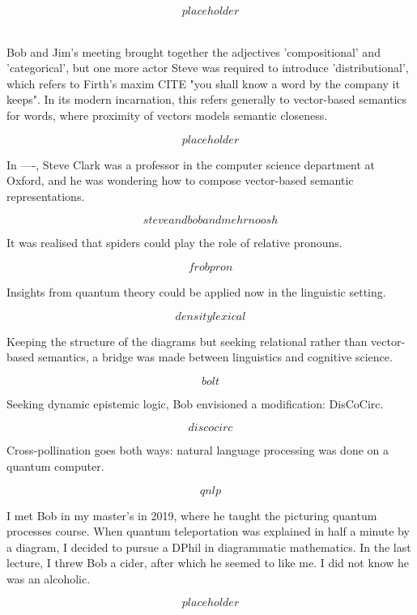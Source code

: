 \begin{fullwidth}
\[placeholder\]

\\

Bob and Jim's meeting brought together the adjectives 'compositional' and 'categorical', but one more actor Steve was required to introduce 'distributional', which refers to Firth's maxim \bR CITE \e "you shall know a word by the company it keeps". In its modern incarnation, this refers generally to vector-based semantics for words, where proximity of vectors models semantic closeness.

\[placeholder\]

In ----, Steve Clark was a professor in the computer science department at Oxford, and he was wondering how to compose vector-based semantic representations.

\[steve and bob and mehrnoosh\]

It was realised that spiders could play the role of relative pronouns.

\[frobpron\]

Insights from quantum theory could be applied now in the linguistic setting.

\[density lexical\]

Keeping the structure of the diagrams but seeking relational rather than vector-based semantics, a bridge was made between linguistics and cognitive science.

\[bolt\]

Seeking dynamic epistemic logic, Bob envisioned a modification: DisCoCirc.

\[discocirc\]

Cross-pollination goes both ways: natural language processing was done on a quantum computer.

\[qnlp\]


I met Bob in my master's in 2019, where he taught the picturing quantum processes course. When quantum teleportation was explained in half a minute by a diagram, I decided to pursue a DPhil in diagrammatic mathematics. In the last lecture, I threw Bob a cider, after which he seemed to like me. I did not know he was an alcoholic.

\[placeholder\]


\end{fullwidth}
